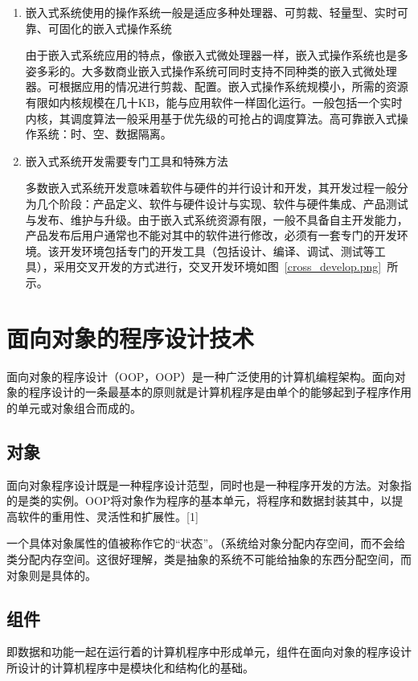 \begin{enumerate}
\item 嵌入式系统使用的操作系统一般是适应多种处理器、可剪裁、轻量型、实时可靠、可固化的嵌入式操作系统

由于嵌入式系统应用的特点，像嵌入式微处理器一样，嵌入式操作系统也是多姿多彩的。大多数商业嵌入式操作系统可同时支持不同种类的嵌入式微处理器。可根据应用的情况进行剪裁、配置。嵌入式操作系统规模小，所需的资源有限如内核规模在几十KB，能与应用软件一样固化运行。一般包括一个实时内核，其调度算法一般采用基于优先级的可抢占的调度算法。高可靠嵌入式操作系统：时、空、数据隔离。

\item 嵌入式系统开发需要专门工具和特殊方法

多数嵌入式系统开发意味着软件与硬件的并行设计和开发，其开发过程一般分为几个阶段：产品定义、软件与硬件设计与实现、软件与硬件集成、产品测试与发布、维护与升级。由于嵌入式系统资源有限，一般不具备自主开发能力，产品发布后用户通常也不能对其中的软件进行修改，必须有一套专门的开发环境。该开发环境包括专门的开发工具（包括设计、编译、调试、测试等工具），采用交叉开发的方式进行，交叉开发环境如图~\ref{cross_develop.png}~所示。
\end{enumerate}

\section{面向对象的程序设计技术}
面向对象的程序设计（\acrlong{OOP}，\acrshort{OOP}）是一种广泛使用的计算机编程架构。面向对象的程序设计的一条最基本的原则就是计算机程序是由单个的能够起到子程序作用的单元或对象组合而成的。

\subsection{对象}
面向对象程序设计既是一种程序设计范型，同时也是一种程序开发的方法。对象指的是类的实例。\acrshort{OOP}将对象作为程序的基本单元，将程序和数据封装其中，以提高软件的重用性、灵活性和扩展性。[1]

一个具体对象属性的值被称作它的“状态”。（系统给对象分配内存空间，而不会给类分配内存空间。这很好理解，类是抽象的系统不可能给抽象的东西分配空间，而对象则是具体的。

\subsection{组件}
即数据和功能一起在运行着的计算机程序中形成单元，组件在面向对象的程序设计所设计的计算机程序中是模块化和结构化的基础。

